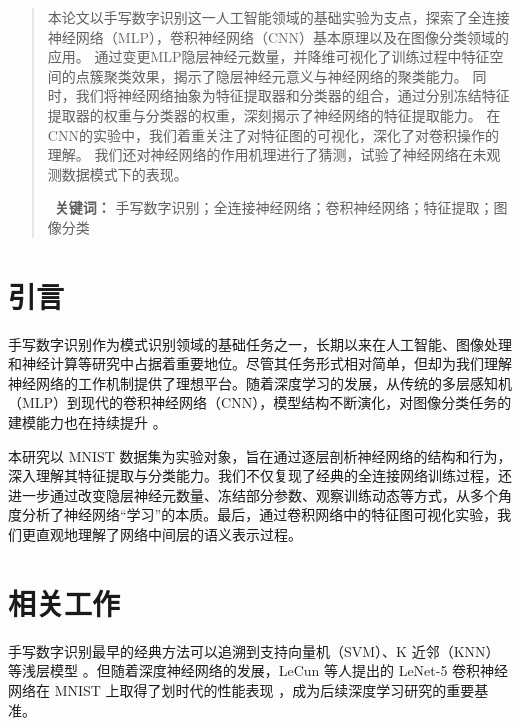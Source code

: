 \documentclass[12pt,a4paper]{article}
\begin{document}



\newcommand{\sectionline}{%
    \noindent\makebox[\linewidth]{\rule{0.8\paperwidth}{0.4pt}}
}

\newpage
\begin{abstract}
本论文以手写数字识别这一人工智能领域的基础实验为支点，探索了全连接神经网络（MLP），卷积神经网络（CNN）基本原理以及在图像分类领域的应用。
通过变更MLP隐层神经元数量，并降维可视化了训练过程中特征空间的点簇聚类效果，揭示了隐层神经元意义与神经网络的聚类能力。
同时，我们将神经网络抽象为特征提取器和分类器的组合，通过分别冻结特征提取器的权重与分类器的权重，深刻揭示了神经网络的特征提取能力。
在CNN的实验中，我们着重关注了对特征图的可视化，深化了对卷积操作的理解。
我们还对神经网络的作用机理进行了猜测，试验了神经网络在未观测数据模式下的表现。



\
\textbf{关键词：} 手写数字识别；全连接神经网络；卷积神经网络；特征提取；图像分类
\end{abstract}

\sectionline

\newpage
\tableofcontents

\newpage

\section{引言}
手写数字识别作为模式识别领域的基础任务之一，长期以来在人工智能、图像处理和神经计算等研究中占据着重要地位。尽管其任务形式相对简单，但却为我们理解神经网络的工作机制提供了理想平台。随着深度学习的发展，从传统的多层感知机（MLP）到现代的卷积神经网络（CNN），模型结构不断演化，对图像分类任务的建模能力也在持续提升 \cite{lecun1998gradient, krizhevsky2012imagenet}。

本研究以 MNIST 数据集为实验对象，旨在通过逐层剖析神经网络的结构和行为，深入理解其特征提取与分类能力。我们不仅复现了经典的全连接网络训练过程，还进一步通过改变隐层神经元数量、冻结部分参数、观察训练动态等方式，从多个角度分析了神经网络“学习”的本质。最后，通过卷积网络中的特征图可视化实验，我们更直观地理解了网络中间层的语义表示过程。


\section{相关工作}

手写数字识别最早的经典方法可以追溯到支持向量机（SVM）、K 近邻（KNN）等浅层模型 \cite{cortes1995support, alpaydin2004introduction}。但随着深度神经网络的发展，LeCun 等人提出的 LeNet-5 卷积神经网络在 MNIST 上取得了划时代的性能表现 \cite{lecun1998gradient}，成为后续深度学习研究的重要基准。
\end{document}
